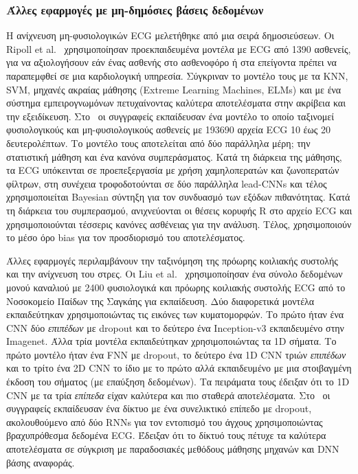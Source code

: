 \subsubsection{Άλλες εφαρμογές με μη-δημόσιες βάσεις δεδομένων}
Η ανίχνευση μη-φυσιολογικών ECG μελετήθηκε από μια σειρά δημοσιεύσεων.
Οι Ripoll et al.~\cite{ripoll2016ecg} χρησιμοποίησαν προεκπαιδευμένα μοντέλα με ECG από 1390 ασθενείς, για να αξιολογήσουν εάν ένας ασθενής στο ασθενοφόρο ή στα επείγοντα πρέπει να παραπεμφθεί σε μια καρδιολογική υπηρεσία.
Σύγκριναν το μοντέλο τους με τα KNN, SVM, μηχανές ακραίας μάθησης (Extreme Learning Machines, ELMs) και με ένα σύστημα εμπειρογνωμόνων πετυχαίνοντας καλύτερα αποτελέσματα στην ακρίβεια και την εξειδίκευση.
Στο~\cite{jin2017classification} οι συγγραφείς εκπαίδευσαν ένα μοντέλο το οποίο ταξινομεί φυσιολογικούς και μη-φυσιολογικούς ασθενείς με 193690 αρχεία ECG 10 έως 20 δευτερολέπτων.
Το μοντέλο τους αποτελείται από δύο παράλληλα μέρη; την στατιστική μάθηση και ένα κανόνα συμπεράσματος.
Κατά τη διάρκεια της μάθησης, τα ECG υπόκεινται σε προεπεξεργασία με χρήση χαμηλοπερατών και ζωνοπερατών φίλτρων, στη συνέχεια τροφοδοτούνται σε δύο παράλληλα lead-CNNs και τέλος χρησιμοποιείται Bayesian σύντηξη για τον συνδυασμό των εξόδων πιθανότητας.
Κατά τη διάρκεια του συμπερασμού, ανιχνεύονται οι θέσεις κορυφής R στο αρχείο ECG και χρησιμοποιούνται τέσσερις κανόνες ασθένειας για την ανάλυση.
Τέλος, χρησιμοποιούν το μέσο όρο bias για τον προσδιορισμό του αποτελέσματος.

Άλλες εφαρμογές περιλαμβάνουν την ταξινόμηση της πρόωρης κοιλιακής συστολής και την ανίχνευση του στρες.
Οι Liu et al.~\cite{liu2018detecting} χρησιμοποίησαν ένα σύνολο δεδομένων μονού καναλιού με 2400 φυσιολογικά και πρόωρης κοιλιακής συστολής ECG από το Νοσοκομείο Παίδων της Σαγκάης για εκπαίδευση.
Δύο διαφορετικά μοντέλα εκπαιδεύτηκαν χρησιμοποιώντας τις εικόνες των κυματομορφών.
Το πρώτο ήταν ένα CNN δύο \textit{επιπέδων} με dropout και το δεύτερο ένα Inception-v3 εκπαιδευμένο στην Imagenet.
Άλλα τρία μοντέλα εκπαιδεύτηκαν χρησιμοποιώντας τα 1D σήματα.
Το πρώτο μοντέλο ήταν ένα FNN με dropout, το δεύτερο ένα 1D CNN τριών \textit{επιπέδων} και το τρίτο ένα 2D CNN το ίδιο με το πρώτο αλλά εκπαιδευμένο με μια στοιβαγμένη έκδοση του σήματος (με επαύξηση δεδομένων).
Τα πειράματα τους έδειξαν ότι το 1D CNN με τα τρία \textit{επίπεδα} είχαν καλύτερα και πιο σταθερά αποτελέσματα.
Στο~\cite{hwang2018deep} οι συγγραφείς εκπαίδευσαν ένα δίκτυο με ένα συνελικτικό επίπεδο με dropout, ακολουθούμενο από δύο RNNs για τον εντοπισμό του άγχους χρησιμοποιώντας βραχυπρόθεσμα δεδομένα ECG\@.
Έδειξαν ότι το δίκτυό τους πέτυχε τα καλύτερα αποτελέσματα σε σύγκριση με παραδοσιακές μεθόδους μάθησης μηχανών και DNN βάσης αναφοράς.

